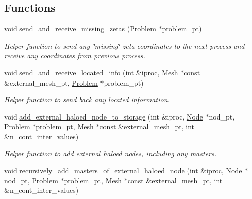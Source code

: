 \subsection*{Functions}
\begin{DoxyCompactItemize}
\item 
void \hyperlink{namespaceoomph_1_1Multi__domain__functions_a2fb1a620c45f362039bef826b32b6785}{send\+\_\+and\+\_\+receive\+\_\+missing\+\_\+zetas} (\hyperlink{classoomph_1_1Problem}{Problem} $\ast$problem\+\_\+pt)
\begin{DoxyCompactList}\small\item\em Helper function to send any \char`\"{}missing\char`\"{} zeta coordinates to the next process and receive any coordinates from previous process. \end{DoxyCompactList}\item 
void \hyperlink{namespaceoomph_1_1Multi__domain__functions_a131c53d0a1557066df4719d24796b3a8}{send\+\_\+and\+\_\+receive\+\_\+located\+\_\+info} (int \&iproc, \hyperlink{classoomph_1_1Mesh}{Mesh} $\ast$const \&external\+\_\+mesh\+\_\+pt, \hyperlink{classoomph_1_1Problem}{Problem} $\ast$problem\+\_\+pt)
\begin{DoxyCompactList}\small\item\em Helper function to send back any located information. \end{DoxyCompactList}\item 
void \hyperlink{namespaceoomph_1_1Multi__domain__functions_aea9c2b1984158b8f560c6fff7c0adea7}{add\+\_\+external\+\_\+haloed\+\_\+node\+\_\+to\+\_\+storage} (int \&iproc, \hyperlink{classoomph_1_1Node}{Node} $\ast$nod\+\_\+pt, \hyperlink{classoomph_1_1Problem}{Problem} $\ast$problem\+\_\+pt, \hyperlink{classoomph_1_1Mesh}{Mesh} $\ast$const \&external\+\_\+mesh\+\_\+pt, int \&n\+\_\+cont\+\_\+inter\+\_\+values)
\begin{DoxyCompactList}\small\item\em Helper function to add external haloed nodes, including any masters. \end{DoxyCompactList}\item 
void \hyperlink{namespaceoomph_1_1Multi__domain__functions_abaafd14a3e78c1965c294797913b44bf}{recursively\+\_\+add\+\_\+masters\+\_\+of\+\_\+external\+\_\+haloed\+\_\+node} (int \&iproc, \hyperlink{classoomph_1_1Node}{Node} $\ast$nod\+\_\+pt, \hyperlink{classoomph_1_1Problem}{Problem} $\ast$problem\+\_\+pt, \hyperlink{classoomph_1_1Mesh}{Mesh} $\ast$const \&external\+\_\+mesh\+\_\+pt, int \&n\+\_\+cont\+\_\+inter\+\_\+values)

\end{DoxyCompactItemize}
